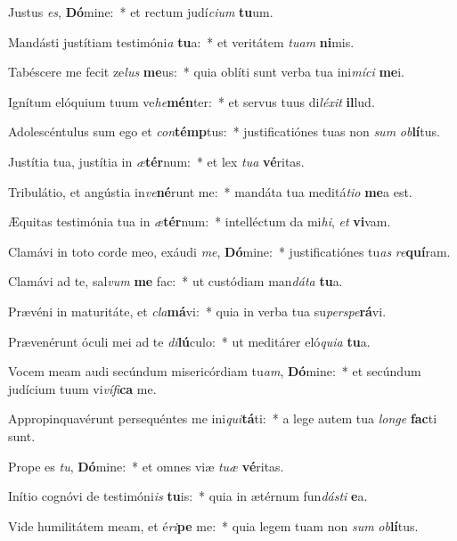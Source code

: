 \item Justus \textit{es}, \textbf{Dó}mine:~* et rectum judí\textit{ci}\textit{um} \textbf{tu}um.
\item Mandásti justítiam testimóni\textit{a} \textbf{tu}a:~* et veritátem \textit{tu}\textit{am} \textbf{ni}mis.
\item Tabéscere me fecit ze\textit{lus} \textbf{me}us:~* quia oblíti sunt verba tua ini\textit{mí}\textit{ci} \textbf{me}i.
\item Ignítum elóquium tuum ve\textit{he}\textbf{mén}ter:~* et servus tuus di\textit{lé}\textit{xit} \textbf{il}lud.
\item Adolescéntulus sum ego et \textit{con}\textbf{témp}tus:~* justificatiónes tuas non \textit{sum} \textit{ob}\textbf{lí}tus.
\item Justítia tua, justítia in \textit{æ}\textbf{tér}num:~* et lex \textit{tu}\textit{a} \textbf{vé}ritas.
\item Tribulátio, et angústia in\textit{ve}\textbf{né}runt me:~* mandáta tua meditá\textit{ti}\textit{o} \textbf{me}a est.
\item Æquitas testimónia tua in \textit{æ}\textbf{tér}num:~* intelléctum da mi\textit{hi}, \textit{et} \textbf{vi}vam.
\item Clamávi in toto corde meo, exáudi \textit{me}, \textbf{Dó}mine:~* justificatiónes tu\textit{as} \textit{re}\textbf{quí}ram.
\item Clamávi ad te, sal\textit{vum} \textbf{me} fac:~* ut custódiam man\textit{dá}\textit{ta} \textbf{tu}a.
\item Prævéni in maturitáte, et \textit{cla}\textbf{má}vi:~* quia in verba tua su\textit{per}\textit{spe}\textbf{rá}vi.
\item Prævenérunt óculi mei ad te \textit{di}\textbf{lú}culo:~* ut meditárer eló\textit{qui}\textit{a} \textbf{tu}a.
\item Vocem meam audi secúndum misericórdiam tu\textit{am}, \textbf{Dó}mine:~* et secúndum judícium tuum vi\textit{ví}\textit{fi}\textbf{ca} me.
\item Appropinquavérunt persequéntes me ini\textit{qui}\textbf{tá}ti:~* a lege autem tua \textit{lon}\textit{ge} \textbf{fac}ti sunt.
\item Prope es \textit{tu}, \textbf{Dó}mine:~* et omnes viæ \textit{tu}\textit{æ} \textbf{vé}ritas.
\item Inítio cognóvi de testimóni\textit{is} \textbf{tu}is:~* quia in ætérnum fun\textit{dás}\textit{ti} \textbf{e}a.
\item Vide humilitátem meam, et é\textit{ri}\textbf{pe} me:~* quia legem tuam non \textit{sum} \textit{ob}\textbf{lí}tus.
